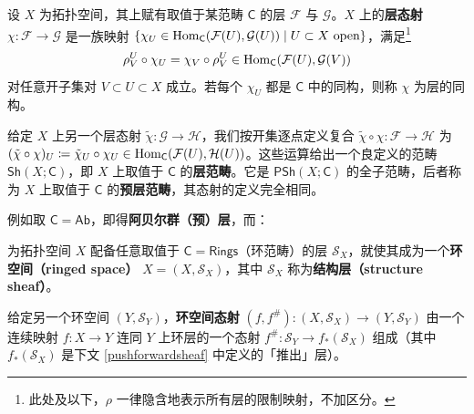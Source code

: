 \begin{Def}									%
设 $X$ 为拓扑空间，其上赋有取值于某范畴 $\mathsf{C}$ 的层 $\mathcal{F}$ 与 $\mathcal{G}$。$X$ 上的\textbf{层态射} $\chi:\mathcal{F}\rightarrow\mathcal{G}$ 是一族映射 $\{\chi_U\in\textup{Hom}_\mathsf{C}(\mathcal{F}(U),\mathcal{G}(U))\mid U\subset X\text{ open}\}$，满足\footnote{此处及以下，$\rho$ 一律隐含地表示所有层的限制映射，不加区分。}
\[
\rho^U_V\circ\chi_U=\chi_V\circ\rho^U_V\in\textup{Hom}_\mathsf{C}(\mathcal{F}(U),\mathcal{G}(V))
\]
对任意开子集对 $V\subset U\subset X$ 成立。若每个 $\chi_U$ 都是 $\mathsf{C}$ 中的同构，则称 $\chi$ 为层的同构。

给定 $X$ 上另一个层态射 $\tilde{\chi}:\mathcal{G}\rightarrow\mathcal{H}$，我们按开集逐点定义复合 $\tilde{\chi}\circ\chi:\mathcal{F}\rightarrow\mathcal{H}$ 为 $(\tilde{\chi}\circ\chi)_U\coloneqq\tilde{\chi}_U\circ\chi_U\in\textup{Hom}_\mathsf{C}(\mathcal{F}(U),\mathcal{H}(U))$。这些运算给出一个良定义的范畴 $\mathsf{Sh}(X;\mathsf{C})$，即 $X$ 上取值于 $\mathsf{C}$ 的\textbf{层范畴}。它是 $\mathsf{PSh}(X;\mathsf{C})$ 的全子范畴，后者称为 $X$ 上取值于 $\mathsf{C}$ 的\textbf{预层范畴}，其态射的定义完全相同。
\end{Def}

例如取 $\mathsf{C}=\mathsf{Ab}$，即得\textbf{阿贝尔群（预）层}，而：

\begin{Def}\label{ringedspace}
为拓扑空间 $X$ 配备任意取值于 $\mathsf{C=Rings}$（环范畴）的层 $\mathcal{S}_X$，就使其成为一个\textbf{环空间（ringed space）} $X=(X,\mathcal{S}_X)$，其中 $\mathcal{S}_X$ 称为\textbf{结构层（structure sheaf）}。

给定另一个环空间 $(Y,\mathcal{S}_Y)$，\textbf{环空间态射} $(f,f^\#):(X,\mathcal{S}_X)\rightarrow (Y,\mathcal{S}_Y)$ 由一个连续映射 $f:X\rightarrow Y$ 连同 $Y$ 上环层的一个态射 $f^\#:\mathcal{S}_Y\rightarrow f_*(\mathcal{S}_X)$ 组成（其中 $f_*(\mathcal{S}_X)$ 是下文 \eqref{pushforwardsheaf} 中定义的「推出」层）。
\end{Def}

